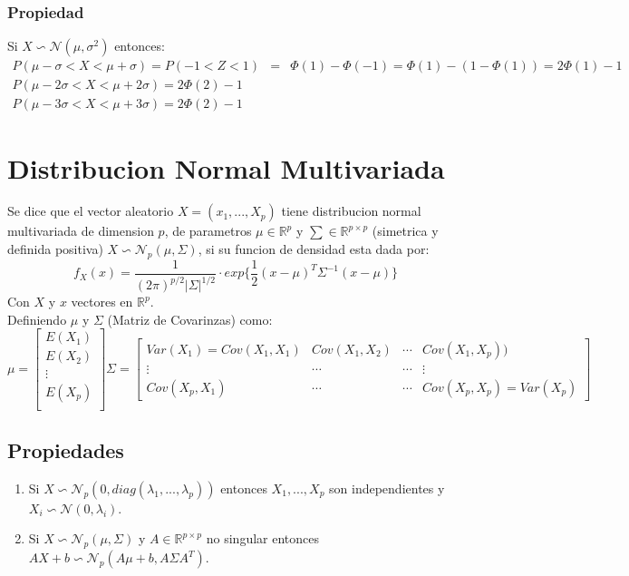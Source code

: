 \documentclass[titlepage,a4paper]{article}
\begin{document}
\subsubsection{Propiedad}
Si $X \backsim \mathcal{N}(\mu,\sigma^{2})$ entonces:
\begin{eqnarray*}
    P(\mu - \sigma < X < \mu + \sigma) = P(-1<Z<1) &=& \Phi(1)- \Phi(-1) = \Phi(1)- (1- \Phi(1)) = 2\Phi(1) -1 \\
    P(\mu - 2\sigma < X < \mu + 2\sigma) = 2\Phi(2)-1 \\
    P(\mu - 3\sigma < X < \mu + 3\sigma) = 2\Phi(2)-1
\end{eqnarray*}
\section{Distribucion Normal Multivariada}
Se dice que el vector aleatorio $X=(x_{1},...,X_{p})$ tiene distribucion normal multivariada de dimension $p$,
de parametros $\mu \in \mathbb{R}^{p}$ y $\sum \in \mathbb{R}^{p\times p}$ (simetrica y definida positiva)
$X \backsim \mathcal{N}_{p}(\mu, \Sigma)$, si su funcion de densidad esta dada por:
\begin{equation*}
    f_{X}(x) = \frac{1}{(2\pi)^{p/2}|\Sigma|^{1/2}}\cdot exp\{\frac{1}{2}(x-\mu)^{T}\Sigma^{-1}(x-\mu)\}
\end{equation*}
Con $X$ y $x$ vectores en $\mathbb{R}^{p}$.\\
Definiendo $\mu$ y $\Sigma$ (Matriz de Covarinzas) como:
\begin{equation*}
    \mu = \begin{bmatrix}
        E(X_{1})\\
        E(X_{2})\\
        \vdots\\
        E(X_{p})\\
    \end{bmatrix} 
    \Sigma = \begin{bmatrix}
        Var(X_{1}) = Cov(X_{1},X_{1}) & Cov(X_{1},X_{2}) & \cdots & Cov(X_{1},X_{p}))\\
        \vdots & \cdots & \cdots & \vdots \\
        Cov(X_{p},X_{1}) & \cdots & \cdots &  Cov(X_{p},X_{p}) = Var(X_{p})
    \end{bmatrix}
\end{equation*}
\subsection{Propiedades}
\begin{enumerate}
    \item Si $X \backsim \mathcal{N}_{p}(0,diag(\lambda_{1},...,\lambda_{p}))$ entonces $X_{1},...,X_{p}$ son independientes y $X_{i} \backsim \mathcal{N}(0,\lambda_{i})$.
    \item Si $X \backsim \mathcal{N}_{p}(\mu,\Sigma)$ y $A \in \mathbb{R}^{p \times p}$ no singular entonces $AX + b \backsim \mathcal{N}_{p}(A\mu+b,A\Sigma A^{T})$.
\end{enumerate}
\end{document}
